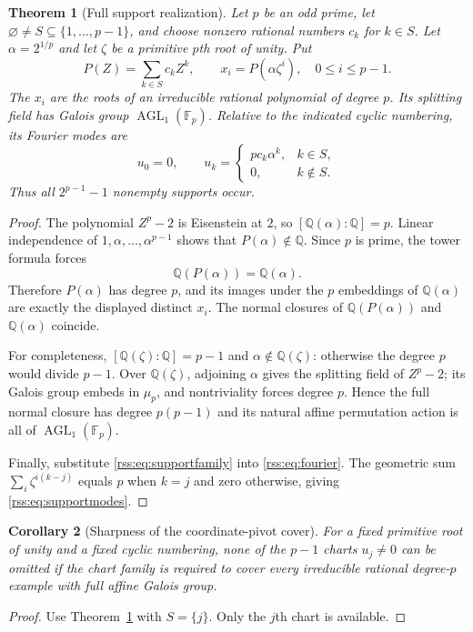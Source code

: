\documentclass[11pt,a4paper]{article}
\newtheorem{theorem}{Theorem}[section]
\newtheorem{corollary}[theorem]{Corollary}
\theoremstyle{definition}
\theoremstyle{remark}
\newcommand{\Q}{\mathbb Q}
\newcommand{\F}{\mathbb F}
\newcommand{\AGL}{\operatorname{AGL}}
\begin{document}
\begin{theorem}[Full support realization]\label{rss:thm:support}
Let $p$ be an odd prime, let
$\varnothing\neq S\subseteq\{1,\ldots,p-1\}$, and choose nonzero rational
numbers $c_k$ for $k\in S$. Let $\alpha=2^{1/p}$ and let $\zeta$ be a
primitive $p$th root of unity. Put
\begin{equation}
 P(Z)=\sum_{k\in S}c_k Z^k,\qquad
 x_i=P(\alpha\zeta^i),\quad 0\leq i\leq p-1.
 \label{rss:eq:supportfamily}
\end{equation}
The $x_i$ are the roots of an irreducible rational polynomial of degree $p$.
Its splitting field has Galois group $\AGL_1(\F_p)$. Relative to the
indicated cyclic numbering, its Fourier modes are
\begin{equation}
 u_0=0,\qquad
 u_k=\begin{cases}p c_k\alpha^k,&k\in S,\\0,&k\notin S.
 \end{cases}
 \label{rss:eq:supportmodes}
\end{equation}
Thus all $2^{p-1}-1$ nonempty supports occur.
\end{theorem}
\begin{proof}
The polynomial $Z^p-2$ is Eisenstein at $2$, so
$[\Q(\alpha):\Q]=p$. Linear independence of
$1,\alpha,\ldots,\alpha^{p-1}$ shows that $P(\alpha)\notin\Q$.
Since $p$ is prime, the tower formula forces
\[
 \Q(P(\alpha))=\Q(\alpha).
\]
Therefore $P(\alpha)$ has degree $p$, and its images under the $p$
embeddings of $\Q(\alpha)$ are exactly the displayed distinct $x_i$.
The normal closures of $\Q(P(\alpha))$ and $\Q(\alpha)$ coincide.

For completeness, $[\Q(\zeta):\Q]=p-1$ and $\alpha\notin\Q(\zeta)$:
otherwise the degree $p$ would divide $p-1$. Over $\Q(\zeta)$, adjoining
$\alpha$ gives the splitting field of $Z^p-2$; its Galois group embeds in
$\mu_p$, and nontriviality forces degree $p$. Hence the full normal closure
has degree $p(p-1)$ and its natural affine permutation action is all of
$\AGL_1(\F_p)$.

Finally, substitute \eqref{rss:eq:supportfamily} into \eqref{rss:eq:fourier}.
The geometric sum
$\sum_i\zeta^{i(k-j)}$ equals $p$ when $k=j$ and zero otherwise,
giving \eqref{rss:eq:supportmodes}.
\end{proof}

\begin{corollary}[Sharpness of the coordinate-pivot cover]\label{rss:cor:charts}
For a fixed primitive root of unity and a fixed cyclic numbering, none of
the $p-1$ charts $u_j\neq0$ can be omitted if the chart family is required
to cover every irreducible rational degree-$p$ example with full affine
Galois group.
\end{corollary}
\begin{proof}
Use Theorem~\ref{rss:thm:support} with $S=\{j\}$. Only the $j$th chart is
available.
\end{proof}
\end{document}
